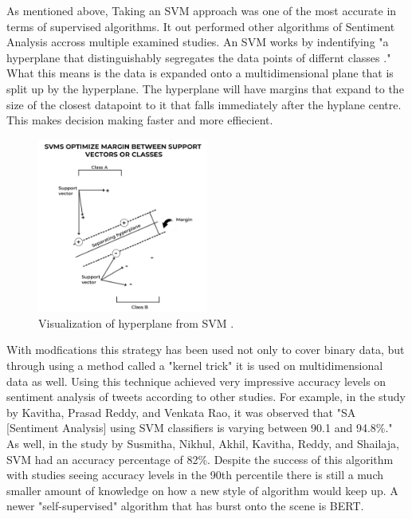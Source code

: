\documentclass[conference]{IEEEtran}
\begin{document}
As mentioned above, Taking an SVM approach was one of the most accurate in terms of supervised algorithms.
It out performed other algorithms of Sentiment Analysis accross multiple examined studies. 
An SVM works by indentifying "a hyperplane that distinguishably segregates the data points of differnt classes \cite{b6}." 
What this means is the data is expanded onto a multidimensional plane that is split up by the hyperplane. 
The hyperplane will have margins that expand to the size of the closest datapoint to it that falls immediately after the hyplane centre. 
This makes decision making faster and more effiecient. 
\begin{figure}[t]
    \centerline{\includegraphics[width=0.5\textwidth]{SVMVisualization.png}}
    \caption{Visualization of hyperplane from SVM \cite{b6}.}
\end{figure}
With modfications this strategy has been used not only to cover binary data, but through using a method called a "kernel trick\cite{b6}" it is used on multidimensional data as well. 
Using this technique achieved very impressive accuracy levels on sentiment analysis of tweets according to other studies.
For example, in the study by Kavitha, Prasad Reddy, and Venkata Rao, it was observed that "SA [Sentiment Analysis] using SVM classifiers is varying between 90.1 and 94.8\%\cite{11}."
As well, in the study by Susmitha, Nikhul, Akhil, Kavitha, Reddy, and Shailaja, SVM had an accuracy percentage of 82\%\cite{b5}. 
Despite the success of this algorithm with studies seeing accuracy levels in the 90th percentile there is still a much smaller amount of knowledge on how a new style of algorithm would keep up.
A newer "self-supervised\cite{b7}" algorithm that has burst onto the scene is BERT.\newline 
\end{document}
